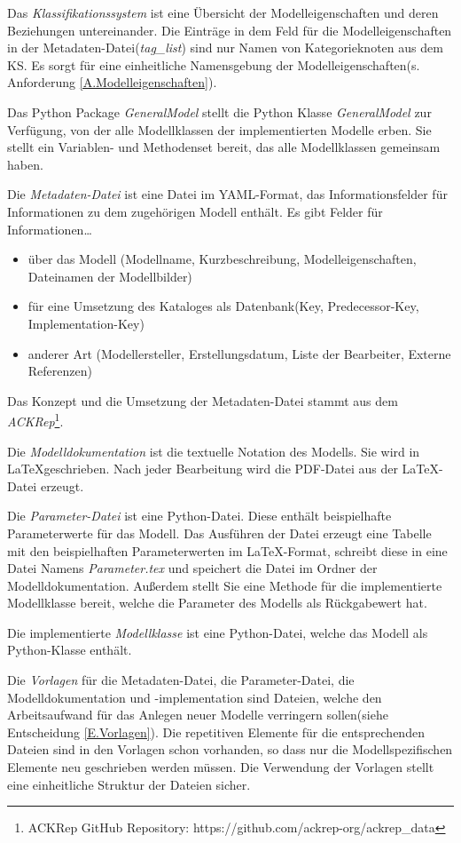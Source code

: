 Das \textit{Klassifikationssystem} ist eine Übersicht der Modelleigenschaften und deren Beziehungen untereinander. Die Einträge in dem Feld für die Modelleigenschaften in der Metadaten-Datei(\textit{tag\_list}) sind nur Namen von Kategorieknoten aus dem KS. Es sorgt für eine einheitliche Namensgebung der Modelleigenschaften(s. Anforderung \ref{A.Modelleigenschaften}). 

Das Python Package \textit{GeneralModel} stellt die Python Klasse \textit{GeneralModel} zur Verfügung, von der alle Modellklassen der implementierten Modelle erben. Sie stellt ein Variablen- und Methodenset bereit, das alle Modellklassen gemeinsam haben.

Die \textit{Metadaten-Datei} ist eine Datei im YAML-Format, das Informationsfelder für Informationen zu dem zugehörigen Modell enthält. Es gibt Felder für Informationen\dots 
\begin{itemize}[label=$\bullet$]
	\item über das Modell (Modellname, Kurzbeschreibung, Modelleigenschaften, Dateinamen der Modellbilder)
	\item für eine Umsetzung des Kataloges als Datenbank(Key, Predecessor-Key, Implementation-Key)
	\item anderer Art (Modellersteller, Erstellungsdatum, Liste der Bearbeiter, Externe Referenzen)
\end{itemize}
Das Konzept und die Umsetzung der Metadaten-Datei stammt aus dem \textit{ACKRep}\footnote{ACKRep GitHub Repository: https://github.com/ackrep-org/ackrep\_data}.

Die \textit{Modelldokumentation} ist die textuelle Notation des Modells. Sie wird in \LaTeX  geschrieben. Nach jeder Bearbeitung wird die PDF-Datei aus der \LaTeX-Datei erzeugt. 

Die \textit{Parameter-Datei} ist eine Python-Datei. Diese enthält beispielhafte Parameterwerte für das Modell. Das Ausführen der Datei erzeugt eine Tabelle mit den beispielhaften Parameterwerten im \LaTeX-Format, schreibt diese in eine Datei Namens \textit{Parameter.tex} und speichert die Datei im Ordner der Modelldokumentation. Außerdem stellt Sie eine Methode für die implementierte Modellklasse bereit, welche die Parameter des Modells als Rückgabewert hat.

Die implementierte \textit{Modellklasse} ist eine Python-Datei, welche das Modell als Python-Klasse enthält. 

Die \textit{Vorlagen} für die Metadaten-Datei, die Parameter-Datei, die Modelldokumentation und -implementation sind Dateien, welche den Arbeitsaufwand für das Anlegen neuer Modelle verringern sollen(siehe Entscheidung \ref{E.Vorlagen}). Die repetitiven Elemente für die entsprechenden Dateien sind in den Vorlagen schon vorhanden, so dass nur die Modellspezifischen Elemente neu geschrieben werden müssen. Die Verwendung der Vorlagen stellt eine einheitliche Struktur der Dateien sicher.

